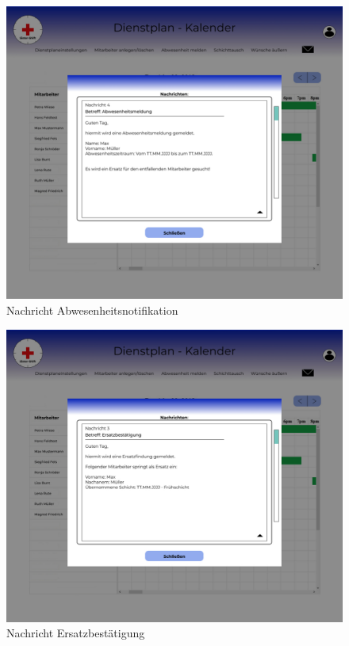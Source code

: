 \documentclass[11pt,
paper=a4,
bibtotocnumbered,	  %
liststotocnumbered,  %
DIV=calc,		  %
tablecaptionabove,	  %
headinclude,
]{article}
\begin{document}
\begin{figure}[H]
\includegraphics[width=1\textwidth]{Bilder/Screens/NachrichtStatleitungAbwesenheit.jpg}{\centering}
\caption{Nachricht Abwesenheitsnotifikation}
\end{figure}
\begin{figure}[H]
\includegraphics[width=1\textwidth]{Bilder/Screens/NachrichtStatleitungErsatzbestaetigung.jpg}{\centering}
\caption{Nachricht Ersatzbestätigung}
\end{figure}
\end{document}
